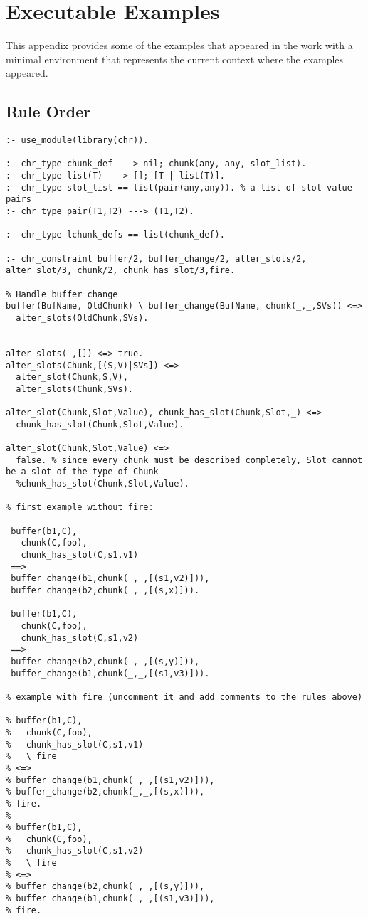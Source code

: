 \chapter{Executable Examples}

This appendix provides some of the examples that appeared in the work with a minimal environment that represents the current context where the examples appeared.

\section{Rule Order}
\label{app:ex:rule_order}

\begin{lstlisting}
:- use_module(library(chr)).

:- chr_type chunk_def ---> nil; chunk(any, any, slot_list).
:- chr_type list(T) ---> []; [T | list(T)].
:- chr_type slot_list == list(pair(any,any)). % a list of slot-value pairs
:- chr_type pair(T1,T2) ---> (T1,T2).

:- chr_type lchunk_defs == list(chunk_def).

:- chr_constraint buffer/2, buffer_change/2, alter_slots/2, alter_slot/3, chunk/2, chunk_has_slot/3,fire.

% Handle buffer_change
buffer(BufName, OldChunk) \ buffer_change(BufName, chunk(_,_,SVs)) <=>
  alter_slots(OldChunk,SVs).

  
alter_slots(_,[]) <=> true.
alter_slots(Chunk,[(S,V)|SVs]) <=> 
  alter_slot(Chunk,S,V),
  alter_slots(Chunk,SVs).
  
alter_slot(Chunk,Slot,Value), chunk_has_slot(Chunk,Slot,_) <=>
  chunk_has_slot(Chunk,Slot,Value).
  
alter_slot(Chunk,Slot,Value) <=>
  false. % since every chunk must be described completely, Slot cannot be a slot of the type of Chunk
  %chunk_has_slot(Chunk,Slot,Value).  

% first example without fire: 
  
 buffer(b1,C),
   chunk(C,foo),
   chunk_has_slot(C,s1,v1)
 ==>
 buffer_change(b1,chunk(_,_,[(s1,v2)])),
 buffer_change(b2,chunk(_,_,[(s,x)])).
 
 buffer(b1,C),
   chunk(C,foo),
   chunk_has_slot(C,s1,v2)
 ==>
 buffer_change(b2,chunk(_,_,[(s,y)])),
 buffer_change(b1,chunk(_,_,[(s1,v3)])).

% example with fire (uncomment it and add comments to the rules above) 
 
% buffer(b1,C),
%   chunk(C,foo),
%   chunk_has_slot(C,s1,v1)
%   \ fire
% <=>
% buffer_change(b1,chunk(_,_,[(s1,v2)])),
% buffer_change(b2,chunk(_,_,[(s,x)])),
% fire.
% 
% buffer(b1,C),
%   chunk(C,foo),
%   chunk_has_slot(C,s1,v2)
%   \ fire
% <=>
% buffer_change(b2,chunk(_,_,[(s,y)])),
% buffer_change(b1,chunk(_,_,[(s1,v3)])),
% fire.
\end{lstlisting}
